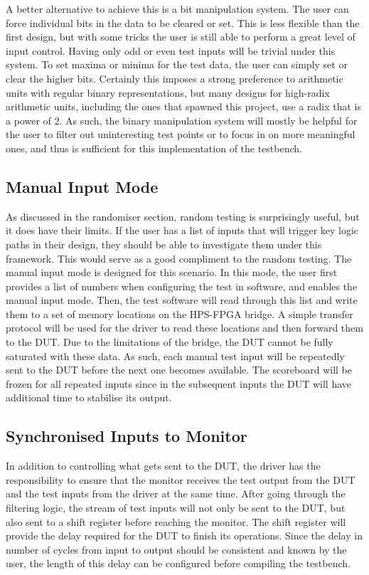 A better alternative to achieve this is a bit manipulation system.
The user can force individual bits in the data to be cleared or set.
This is less flexible than the first design, but with some tricks the user is still able to perform a great level of input control.
Having only odd or even test inputs will be trivial under this system.
To set maxima or minima for the test data, the user can simply set or clear the higher bits.
Certainly this imposes a strong preference to arithmetic units with regular binary representations, but many designs for high-radix arithmetic units, including the ones that spawned this project, use a radix that is a power of 2.
As such, the binary manipulation system will mostly be helpful for the user to filter out uninteresting test points or to focus in on more meaningful ones, and thus is sufficient for this implementation of the testbench.

\subsection{Manual Input Mode}

As discussed in the randomiser section, random testing is surprisingly useful, but it does have their limits.
If the user has a list of inputs that will trigger key logic paths in their design, they should be able to investigate them under this framework.
This would serve as a good compliment to the random testing.
The manual input mode is designed for this scenario.
In this mode, the user first provides a list of numbers when configuring the test in software, and enables the manual input mode.
Then, the test software will read through this list and write them to a set of memory locations on the HPS-FPGA bridge.
A simple transfer protocol will be used for the driver to read these locations and then forward them to the DUT.
Due to the limitations of the bridge, the DUT cannot be fully saturated with these data.
As such, each manual test input will be repeatedly sent to the DUT before the next one becomes available.
The scoreboard will be frozen for all repeated inputs since in the subsequent inputs the DUT will have additional time to stabilise its output.

\subsection{Synchronised Inputs to Monitor}
In addition to controlling what gets sent to the DUT, the driver has the responsibility to ensure that the monitor receives the test output from the DUT and the test inputs from the driver at the same time.
After going through the filtering logic, the stream of test inputs will not only be sent to the DUT, but also sent to a shift register before reaching the monitor.
The shift register will provide the delay required for the DUT to finish its operations.
Since the delay in number of cycles from input to output should be consistent and known by the user, the length of this delay can be configured before compiling the testbench.


